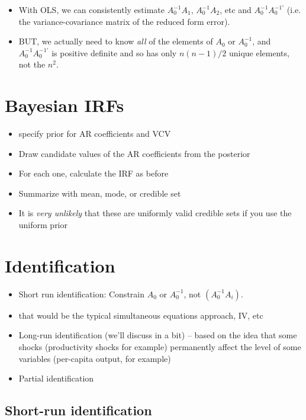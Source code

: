 \begin{itemize}
\item With OLS, we can consistently estimate $A_0^{-1} A_1$, $A_0^{-1}
  A_2$, etc and $A_0^{-1} A_0^{-1\prime}$ (i.e. the variance-covariance
  matrix of the reduced form error).
\item BUT, we actually need to know \emph{all} of the elements of
  $A_0$ or $A_0^{-1}$, and $A_0^{-1} A_0^{-1\prime}$ is positive definite
  and so has only $n (n-1) / 2$ unique elements, not the $n^2$.
\end{itemize}

\section{Bayesian IRFs}


\begin{itemize}
\item specify prior for AR coefficients and VCV
\item Draw candidate values of the AR coefficients from the posterior
\item For each one, calculate the IRF as before
\item Summarize with mean, mode, or credible set
\item It is \emph{very unlikely} that these are uniformly valid
  credible sets if you use the uniform prior
\end{itemize}

\section{Identification}

\begin{itemize}
\item Short run identification: Constrain $A_0$ or $A_0^{-1}$, not
  $(A_0^{-1} A_i)$.
\item that would be the typical simultaneous equations approach, IV,
  etc
\item Long-run identification (we'll discuss in a bit) -- based on the
  idea that some shocks (productivity shocks for example) permanently
  affect the level of some variables (per-capita output, for example)
\item Partial identification
\end{itemize}

\subsection{Short-run identification}

